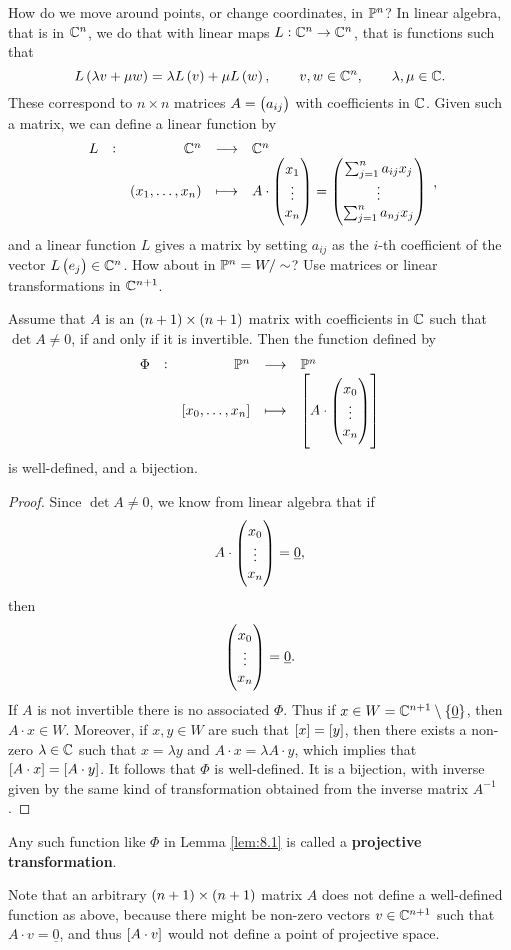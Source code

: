 How do we move around points, or change coordinates, in $ \mathbb{P}^n $? In linear algebra, that is in $ \mathbb{C}^n $, we do that with linear maps $ L : \mathbb{C}^n \to \mathbb{C}^n $, that is functions such that
$$ L\br{\lambda v + \mu w} = \lambda L\br{v} + \mu L\br{w}, \qquad v, w \in \CC^n, \qquad \lambda, \mu \in \CC. $$
These correspond to $ n \times n $ matrices $ A = \br{a_{ij}} $ with coefficients in $ \mathbb{C} $. Given such a matrix, we can define a linear function by
$$ \function[L]{\CC^n}{\CC^n}{\br{x_1, \dots, x_n}}{A \cdot \threebyone{x_1}{\vdots}{x_n} = \threebyone{\sum_{j = 1}^n a_{ij}x_j}{\vdots}{\sum_{j = 1}^n a_{nj}x_j}}, $$
and a linear function $ L $ gives a matrix by setting $ a_{ij} $ as the $ i $-th coefficient of the vector $ L\br{e_j} \in \CC^n $. How about in $ \mathbb{P}^n = W / \sim $? Use matrices or linear transformations in $ \mathbb{C}^{n + 1} $.

\begin{lemma}
\label{lem:8.1}
Assume that $ A $ is an $ \br{n + 1} \times \br{n + 1} $ matrix with coefficients in $ \mathbb{C} $ such that $ \det A \ne 0 $, if and only if it is invertible. Then the function defined by
$$ \function[\Phi]{\PP^n}{\PP^n}{\sbr{x_0, \dots, x_n}}{\sbr{A \cdot \threebyone{x_0}{\vdots}{x_n}}} $$
is well-defined, and a bijection.
\end{lemma}

\begin{proof}
Since $ \det A \ne 0 $, we know from linear algebra that if
$$ A \cdot \begin{pmatrix} x_0 \\ \vdots \\ x_n \end{pmatrix} = \underline{0}, $$
then
$$ \begin{pmatrix} x_0 \\ \vdots \\ x_n \end{pmatrix} = \underline{0}. $$
If $ A $ is not invertible there is no associated $ \Phi $. Thus if $ x \in W = \CC^{n + 1} \setminus \cbr{\underline{0}} $, then $ A \cdot x \in W $. Moreover, if $ x, y \in W $ are such that $ \sbr{x} = \sbr{y} $, then there exists a non-zero $ \lambda \in \mathbb{C} $ such that $ x = \lambda y $ and $ A \cdot x = \lambda A \cdot y $, which implies that $ \sbr{A \cdot x} = \sbr{A \cdot y} $. It follows that $ \Phi $ is well-defined. It is a bijection, with inverse given by the same kind of transformation obtained from the inverse matrix $ A^{-1} $.
\end{proof}

\begin{definition}
Any such function like $ \Phi $ in Lemma \ref{lem:8.1} is called a \textbf{projective transformation}.
\end{definition}

\begin{remark}
Note that an arbitrary $ \br{n + 1} \times \br{n + 1} $ matrix $ A $ does not define a well-defined function as above, because there might be non-zero vectors $ v \in \mathbb{C}^{n + 1} $ such that $ A \cdot v = \underline{0} $, and thus $ \sbr{A \cdot v} $ would not define a point of projective space.
\end{remark}

